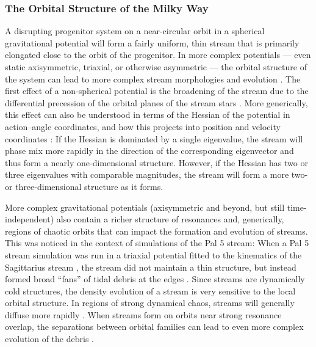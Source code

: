 \documentclass[final,5p,times,twocolumn,authoryear]{elsarticle}
\begin{document}


\subsubsection{The Orbital Structure of the Milky Way}

A disrupting progenitor system on a near-circular orbit in a spherical gravitational
potential will form a fairly uniform, thin stream that is primarily elongated close to
the orbit of the progenitor.
In more complex potentials --- even static axisymmetric, triaxial, or otherwise
asymmetric --- the orbital structure of the system can lead to more complex stream
morphologies and evolution \citep[e.g.,][]{amorisco:2015b}.
The first effect of a non-spherical potential is the broadening of the stream due to the
differential precession of the orbital planes of the stream stars \citep{erkal:2016b}.
More generically, this effect can also be understood in terms of the Hessian of the
potential in action--angle coordinates, and how this projects into position and velocity
coordinates \citep{sanders:2013a}: If the Hessian is dominated by a single eigenvalue,
the stream will phase mix more rapidly in the direction of the corresponding eigenvector
and thus form a nearly one-dimensional structure.
However, if the Hessian has two or three eigenvalues with comparable magnitudes, the
stream will form a more two- or three-dimensional structure as it forms.

More complex gravitational potentials (axisymmetric and beyond, but still
time-independent) also contain a richer structure of resonances and, generically,
regions of chaotic orbits that can impact the formation and evolution of streams.
This was noticed in the context of simulations of the Pal 5 stream: When a Pal 5 stream
simulation was run in a triaxial potential fitted to the kinematics of the Sagittarius
stream \citep{law:2010}, the stream did not maintain a thin structure, but instead
formed broad ``fans'' of tidal debris at the edges \citep{pearson:2015}.
Since streams are dynamically cold structures, the density evolution of a stream is very
sensitive to the local orbital structure.
In regions of strong dynamical chaos, streams will generally diffuse more rapidly
\citep{price-whelan:2016a, mestre:2020}.
When streams form on orbits near strong resonance overlap, the separations between
orbital families can lead to even more complex evolution of the debris
\citep{yavetz:2021,yavetz:2023}.
\end{document}
